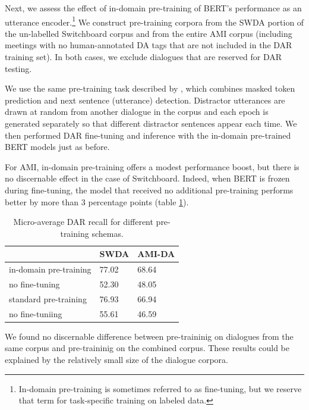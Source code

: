 \documentclass[11pt,a4paper]{article}
\begin{document}
Next, we assess the effect of in-domain pre-training of BERT's performance as an utterance encoder.\footnote{
In-domain pre-training is sometimes referred to as fine-tuning, but we reserve that term for task-specific training on labeled data.}
We construct pre-training corpora from the SWDA portion of the un-labelled Switchboard corpus and from the entire AMI corpus (including meetings with no human-annotated DA tags that are not included in the DAR training set).
In both cases, we exclude dialogues that are reserved for DAR testing.

We use the same pre-training task described by \citet{devlinBERTPretrainingDeep2018}, which combines masked token prediction and next sentence (utterance) detection. 
Distractor utterances are drawn at random from another dialogue in the corpus
and each epoch is generated separately so that different distractor sentences appear each time.
We then performed DAR fine-tuning and inference with the in-domain pre-trained BERT models just as before.

For AMI, in-domain pre-training offers a modest performance boost, but there is no discernable effect in the case of Switchboard.
Indeed, when BERT is frozen during fine-tuning, the model that received no additional pre-training performs better by more than 3 percentage points (table \ref{tab:exp3-recall}).

\begin{table}[]
\begin{tabular}{@{}lll@{}}
\toprule
                       & SWDA  & AMI-DA \\ \midrule
in-domain pre-training & 77.02 & 68.64  \\
no fine-tuning         & 52.30 & 48.05  \\ \midrule
standard pre-training  & 76.93 & 66.94  \\
no fine-tuniing        & 55.61 & 46.59  \\ \bottomrule
\end{tabular}
  \caption{Micro-average DAR recall for different pre-training schemas.}
  \label{tab:exp3-recall}
\end{table}

We found no discernable difference between pre-traininig on dialogues from the same corpus and pre-traininig on the combined corpus.
These results could be explained by the relatively small size of the dialogue corpora.

\end{document}
